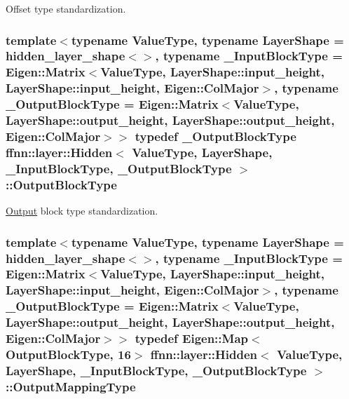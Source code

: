 Offset type standardization. 

\hypertarget{classffnn_1_1layer_1_1_hidden_a9b9e276188ef490ea5301f553225c735}{
\subsubsection[{Output\-Block\-Type}]{\setlength{\rightskip}{0pt plus 5cm}template$<$typename Value\-Type, typename Layer\-Shape = hidden\-\_\-layer\-\_\-shape$<$$>$, typename \-\_\-\-Input\-Block\-Type = Eigen\-::\-Matrix$<$\-Value\-Type, Layer\-Shape\-::input\-\_\-height, Layer\-Shape\-::input\-\_\-height, Eigen\-::\-Col\-Major$>$, typename \-\_\-\-Output\-Block\-Type = Eigen\-::\-Matrix$<$\-Value\-Type, Layer\-Shape\-::output\-\_\-height, Layer\-Shape\-::output\-\_\-height, Eigen\-::\-Col\-Major$>$$>$ typedef \-\_\-\-Output\-Block\-Type {\bf ffnn\-::layer\-::\-Hidden}$<$ Value\-Type, Layer\-Shape, \-\_\-\-Input\-Block\-Type, \-\_\-\-Output\-Block\-Type $>$\-::{\bf Output\-Block\-Type}}}\label{classffnn_1_1layer_1_1_hidden_a9b9e276188ef490ea5301f553225c735}


\hyperlink{classffnn_1_1layer_1_1_output}{Output} block type standardization. 

\hypertarget{classffnn_1_1layer_1_1_hidden_a619ae9b0890cb86b66ac2b591b5a5610}{
\subsubsection[{Output\-Mapping\-Type}]{\setlength{\rightskip}{0pt plus 5cm}template$<$typename Value\-Type, typename Layer\-Shape = hidden\-\_\-layer\-\_\-shape$<$$>$, typename \-\_\-\-Input\-Block\-Type = Eigen\-::\-Matrix$<$\-Value\-Type, Layer\-Shape\-::input\-\_\-height, Layer\-Shape\-::input\-\_\-height, Eigen\-::\-Col\-Major$>$, typename \-\_\-\-Output\-Block\-Type = Eigen\-::\-Matrix$<$\-Value\-Type, Layer\-Shape\-::output\-\_\-height, Layer\-Shape\-::output\-\_\-height, Eigen\-::\-Col\-Major$>$$>$ typedef Eigen\-::\-Map$<${\bf Output\-Block\-Type}, 16$>$ {\bf ffnn\-::layer\-::\-Hidden}$<$ Value\-Type, Layer\-Shape, \-\_\-\-Input\-Block\-Type, \-\_\-\-Output\-Block\-Type $>$\-::{\bf Output\-Mapping\-Type}}}\label{classffnn_1_1layer_1_1_hidden_a619ae9b0890cb86b66ac2b591b5a5610}


